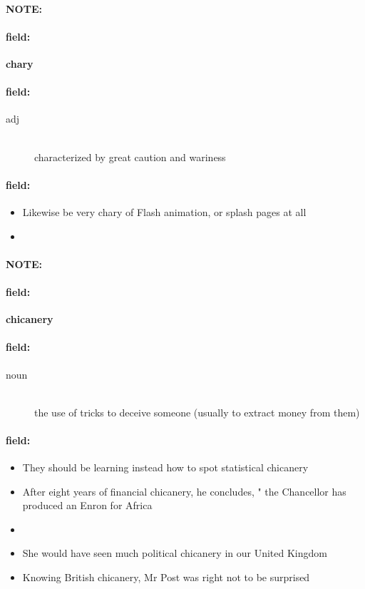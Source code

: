 \documentclass[12pt]{article}
\newenvironment{note}{\paragraph{NOTE:}}{}
\newenvironment{field}{\paragraph{field:}}{}
\begin{document}
\begin{note}
\begin{field}
\textbf{\large chary}
\end{field}


\begin{field}
\begin{description}
\item[adj] \hfill \\ 
characterized by great caution and wariness

\end{description}
\end{field}

\begin{field}
\begin{itemize}
\item Likewise be very chary of Flash animation, or splash pages at all
\item 
\end{itemize}
\end{field}
\end{note}
\begin{note}
\begin{field}
\textbf{\large chicanery}
\end{field}


\begin{field}
\begin{description}
\item[noun] \hfill \\ 
the use of tricks to deceive someone (usually to extract money from them)

\end{description}
\end{field}

\begin{field}
\begin{itemize}
\item They should be learning instead how to spot statistical chicanery
\item After eight years of financial chicanery, he concludes, " the Chancellor has produced an Enron for Africa
\item 
\item She would have seen much political chicanery in our United Kingdom
\item Knowing British chicanery, Mr Post was right not to be surprised
\end{itemize}
\end{field}
\end{note}
\end{document}
